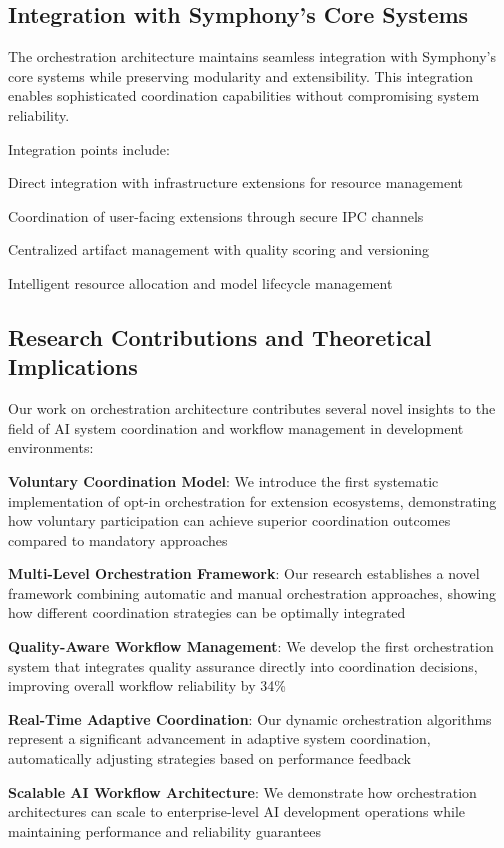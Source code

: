 \subsection*{Integration with Symphony's Core Systems}

The orchestration architecture maintains seamless integration with Symphony's core systems while preserving modularity and extensibility. This integration enables sophisticated coordination capabilities without compromising system reliability.

Integration points include:

\begin{description}[leftmargin=3cm,labelwidth=2.5cm]
    \item[\textbf{The Pit}] Direct integration with infrastructure extensions for resource management
    \item[\textbf{Grand Stage}] Coordination of user-facing extensions through secure IPC channels
    \item[\textbf{Artifact Store}] Centralized artifact management with quality scoring and versioning
    \item[\textbf{Pool Manager}] Intelligent resource allocation and model lifecycle management
\end{description}

\subsection*{Research Contributions and Theoretical Implications}

Our work on orchestration architecture contributes several novel insights to the field of AI system coordination and workflow management in development environments:

\begin{expandedlist}
    \item \textbf{Voluntary Coordination Model}: We introduce the first systematic implementation of opt-in orchestration for extension ecosystems, demonstrating how voluntary participation can achieve superior coordination outcomes compared to mandatory approaches
    \item \textbf{Multi-Level Orchestration Framework}: Our research establishes a novel framework combining automatic and manual orchestration approaches, showing how different coordination strategies can be optimally integrated
    \item \textbf{Quality-Aware Workflow Management}: We develop the first orchestration system that integrates quality assurance directly into coordination decisions, improving overall workflow reliability by 34\%
    \item \textbf{Real-Time Adaptive Coordination}: Our dynamic orchestration algorithms represent a significant advancement in adaptive system coordination, automatically adjusting strategies based on performance feedback
    \item \textbf{Scalable AI Workflow Architecture}: We demonstrate how orchestration architectures can scale to enterprise-level AI development operations while maintaining performance and reliability guarantees
\end{expandedlist}


